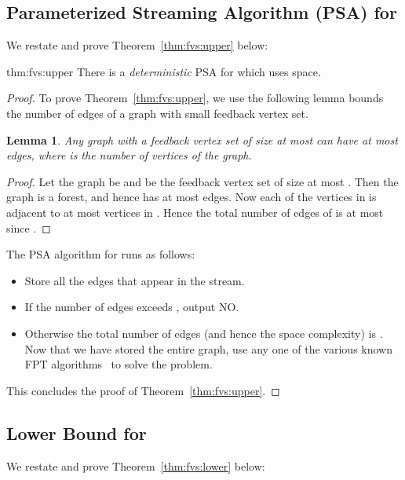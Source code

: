\documentclass[11pt,letter]{article}
\newtheorem{lemma}[theorem]{Lemma}
\begin{document}
\subsection{Parameterized Streaming Algorithm (PSA) for }

We restate and prove Theorem~\ref{thm:fvs:upper} below:

\begin{reptheorem}{thm:fvs:upper}
There is a \emph{deterministic} PSA for  which uses  space.
\end{reptheorem}



\begin{proof}
To prove Theorem~\ref{thm:fvs:upper}, we use the following lemma bounds the number of edges of a graph with small feedback vertex set.

\begin{lemma}
Any graph with a feedback vertex set of size at most  can have at most  edges, where  is the number of vertices of the graph.
\end{lemma}
\begin{proof}
Let the graph be  and  be the feedback vertex
set of size at most . Then the graph  is a forest,
and hence has at most  edges. Now each of the vertices in 
is adjacent to at most  vertices in . Hence the total number
of edges of  is at most  since .
\end{proof}

\noindent The PSA algorithm for  runs as follows:
\begin{itemize}
\item Store all the edges that appear in the stream.
\item If the number of edges exceeds , output NO.
\item Otherwise the total number of edges (and hence the space complexity) is . Now that we have stored the entire graph, use any one of the various known FPT algorithms~\cite{DBLP:conf/swat/CaoCL10, DBLP:journals/corr/KociumakaP13} to solve the  problem.
\end{itemize}
This concludes the proof of Theorem~\ref{thm:fvs:upper}.
\end{proof}


\subsection{ Lower Bound for }

We restate and prove Theorem~\ref{thm:fvs:lower} below:
\end{document}
